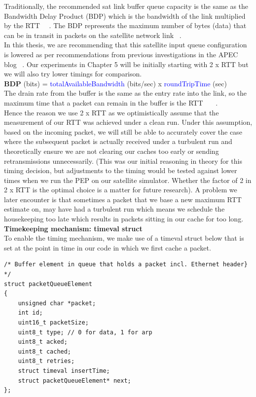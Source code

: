 Traditionally, the recommended sat link buffer queue capacity is the same as the Bandwidth Delay Product (BDP) which is the bandwidth of the link multiplied by the RTT ~\cite{20}~\cite{21}. The BDP represents the maximum number of bytes (data) that can be in transit in packets on the satellite network link ~\cite{14}.\\

In this thesis, we are recommending that this satellite input queue configuration is lowered as per recommendations from previous investigations in the APEC blog ~\cite{20}. Our experiments in Chapter 5 will be initially starting with 2 x RTT but we will also try lower timings for comparison.\\


\textbf{BDP} (bits) = \textcolor{blue}{totalAvailableBandwidth} (bits/sec) x \textcolor{blue}{roundTripTime} (sec) \\


The drain rate from the buffer is the same as the entry rate into the link, so the maximum time that a packet can remain in the buffer is the RTT ~\cite{4}~\cite{5}~\cite{20}.\\

Hence the reason we use 2 x RTT as we optimistically assume that the measurement of our RTT was achieved under a clean run. Under this assumption, based on the incoming packet, we will still be able to accurately cover the case where the subsequent packet is actually received under a turbulent run and theoretically ensure we are not clearing our caches too early or sending retransmissions unnecessarily. (This was our initial reasoning in theory for this timing decision, but adjustments to the timing would be tested against lower times when we run the PEP on our satellite simulator. Whether the factor of 2 in 2 x RTT is the optimal choice is a matter for future research). A problem we later encounter is that sometimes a packet that we base a new maximum RTT estimate on, may have had a turbulent run which means we schedule the housekeeping too late which results in packets sitting in our cache for too long. \\

\noindent \textbf{Timekeeping mechanism: timeval struct }\\
To enable the timing mechanism, we make use of a timeval struct below that is set at the point in time in our code in which we first cache a packet.  \\

\begin{lstlisting}
/* Buffer element in queue that holds a packet incl. Ethernet header} */
struct packetQueueElement
{
    unsigned char *packet;
    int id;
    uint16_t packetSize;
    uint8_t type; // 0 for data, 1 for arp
    uint8_t acked;
    uint8_t cached; 
    uint8_t retries;
    struct timeval insertTime;
    struct packetQueueElement* next;
};
\end{lstlisting}

